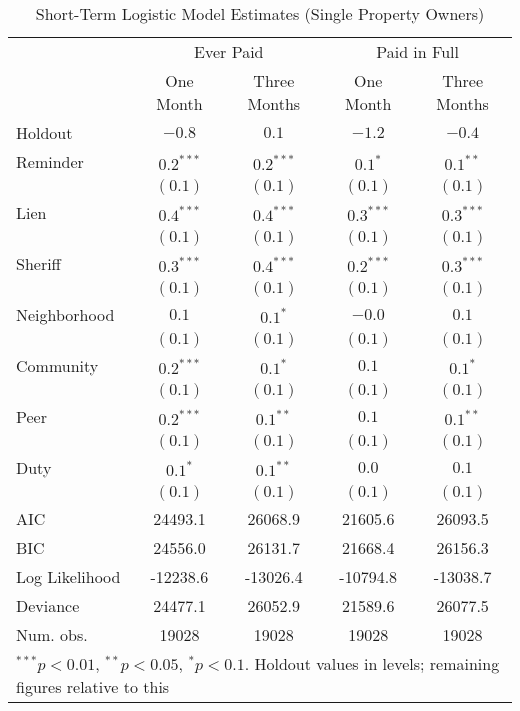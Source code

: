 \documentclass[12pt]{article}
\begin{document}
\begin{appendix}
\begin{table}[htbp]
\caption{Short-Term Logistic Model Estimates (Single Property Owners)}\label{sh_logit}
\begin{center}
\begin{tabular}{l c c c c }
\hline
 & \multicolumn{2}{c}{Ever Paid} & \multicolumn{2}{c}{Paid in Full} \\
 & One Month & Three Months & One Month & Three Months \\
Holdout        & $-0.8$ & $0.1$       & $-1.2$ & $-0.4$ \\
\hline
Reminder        & $0.2^{***}$  & $0.2^{***}$ & $0.1^{*}$    & $0.1^{**}$   \\
               & $(0.1)$      & $(0.1)$     & $(0.1)$      & $(0.1)$      \\
Lien           & $0.4^{***}$  & $0.4^{***}$ & $0.3^{***}$  & $0.3^{***}$  \\
               & $(0.1)$      & $(0.1)$     & $(0.1)$      & $(0.1)$      \\
Sheriff        & $0.3^{***}$  & $0.4^{***}$ & $0.2^{***}$  & $0.3^{***}$  \\
               & $(0.1)$      & $(0.1)$     & $(0.1)$      & $(0.1)$      \\
Neighborhood   & $0.1$        & $0.1^{*}$   & $-0.0$       & $0.1$        \\
               & $(0.1)$      & $(0.1)$     & $(0.1)$      & $(0.1)$      \\
Community      & $0.2^{***}$  & $0.1^{*}$   & $0.1$        & $0.1^{*}$    \\
               & $(0.1)$      & $(0.1)$     & $(0.1)$      & $(0.1)$      \\
Peer           & $0.2^{***}$  & $0.1^{**}$  & $0.1$        & $0.1^{**}$   \\
               & $(0.1)$      & $(0.1)$     & $(0.1)$      & $(0.1)$      \\
Duty           & $0.1^{*}$    & $0.1^{**}$  & $0.0$        & $0.1$        \\
               & $(0.1)$      & $(0.1)$     & $(0.1)$      & $(0.1)$      \\
\hline
AIC            & 24493.1      & 26068.9     & 21605.6      & 26093.5      \\
BIC            & 24556.0      & 26131.7     & 21668.4      & 26156.3      \\
Log Likelihood & -12238.6     & -13026.4    & -10794.8     & -13038.7     \\
Deviance       & 24477.1      & 26052.9     & 21589.6      & 26077.5      \\
Num. obs.      & 19028        & 19028       & 19028        & 19028        \\
\hline
\multicolumn{5}{l}{\scriptsize{$^{***}p<0.01$, $^{**}p<0.05$,
    $^*p<0.1$. Holdout values in levels; remaining figures relative to
    this}}
\end{tabular}
\end{center}
\end{table}


\end{appendix}
\end{document}
